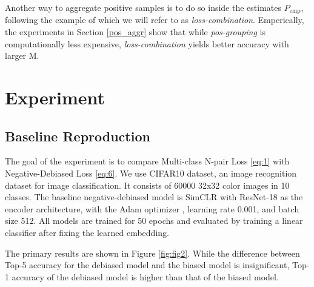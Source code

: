 \documentclass{article}
\begin{document}
Another way to aggregate positive samples is to do so inside the estimates $P_{\text{emp}}$, following the example of \citep{chuang2021debiased} which we will refer to as \textit{loss-combination}. Emperically, the experiments in Section \ref{pos_aggr} show that while \textit{pos-grouping} is computationally less expensive, \textit{loss-combination} yields better accuracy with larger M.



\section{Experiment}
\subsection{Baseline Reproduction}

The goal of the experiment is to compare Multi-class N-pair Loss \ref{eq:1} with Negative-Debiased Loss \ref{eq:6}. We use CIFAR10 \citep{krizhevsky2009learning} dataset, an image recognition dataset for image classification. It consists of 60000 32x32 color images in 10 classes. The baseline negative-debiased model is SimCLR \citep{Chen2020SimCLR} with ResNet-18 \citep{7780459} as the encoder architecture, with the Adam optimizer \citep{Diederik2014Adam}, learning rate 0.001, and batch size 512. All models are trained for 50 epochs and evaluated by training a linear classifier after fixing the learned embedding.

 The primary results are shown in Figure \ref{fig:fig2}. While the difference between Top-5 accuracy for the debiased model and the biased model is insignificant, Top-1 accuracy of the debiased model is higher than that of the biased model. 
\end{document}

